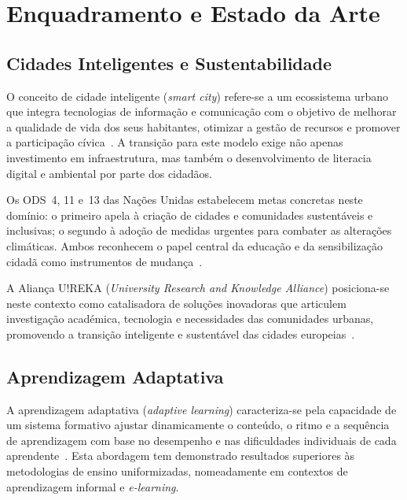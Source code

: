 %
%
\chapter{Enquadramento e Estado da Arte}
\label{cha:enquadramento}

\section{Cidades Inteligentes e Sustentabilidade}
\label{sec:smart_cities}

O conceito de cidade inteligente (\textit{smart city}) refere-se a um ecossistema urbano que integra tecnologias de informação e comunicação com o objetivo de melhorar a qualidade de vida dos seus habitantes, otimizar a gestão de recursos e promover a participação cívica~\cite{neirotti2014current}. A transição para este modelo exige não apenas investimento em infraestrutura, mas também o desenvolvimento de literacia digital e ambiental por parte dos cidadãos.

Os ODS~4, 11 e~13 das Nações Unidas estabelecem metas concretas neste domínio: o primeiro apela à criação de cidades e comunidades sustentáveis e inclusivas; o segundo à adoção de medidas urgentes para combater as alterações climáticas. Ambos reconhecem o papel central da educação e da sensibilização cidadã como instrumentos de mudança~\cite{un2015sdg}.

A Aliança U!REKA (\textit{University Research and Knowledge Alliance}) posiciona-se neste contexto como catalisadora de soluções inovadoras que articulem investigação académica, tecnologia e necessidades das comunidades urbanas, promovendo a transição inteligente e sustentável das cidades europeias~\cite{ureka2024}.

\section{Aprendizagem Adaptativa}
\label{sec:adaptive_learning}

A aprendizagem adaptativa (\textit{adaptive learning}) caracteriza-se pela capacidade de um sistema formativo ajustar dinamicamente o conteúdo, o ritmo e a sequência de aprendizagem com base no desempenho e nas dificuldades individuais de cada aprendente~\cite{vanlehn2011relative}. Esta abordagem tem demonstrado resultados superiores às metodologias de ensino uniformizadas, nomeadamente em contextos de aprendizagem informal e \textit{e-learning}.

